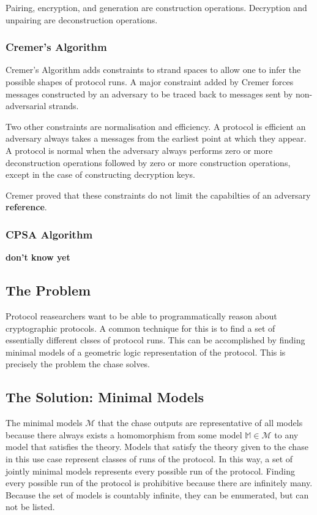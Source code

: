 			Pairing, encryption, and generation are construction operations.
			Decryption and unpairing are deconstruction operations.

		\subsubsection{Cremer's Algorithm}

			Cremer's Algorithm adds constraints to strand spaces to allow one
			to infer the possible shapes of protocol runs. A major constraint
			added by Cremer forces messages constructed by an adversary to be
			traced back to messages sent by non-adversarial strands.

			Two other constraints are normalisation and efficiency. A protocol
			is efficient an adversary always takes a messages from the earliest
			point at which they appear. A protocol is normal when the adversary
			always performs zero or more deconstruction operations followed by
			zero or more construction operations, except in the case of
			constructing decryption keys.

			Cremer proved that these constraints do not limit the capabilties
			of an adversary \textbf{reference}.

		\subsubsection{CPSA Algorithm}

			\textbf{ don't know yet }

	\subsection{The Problem}

		Protocol reasearchers want to be able to programmatically reason about
		cryptographic protocols. A common technique for this is to find a set of
		essentially different clsses of protocol runs. This can be accomplished by
		finding minimal models of a geometric logic representation of the protocol.
		This is precisely the problem the chase solves.

	\subsection{The Solution: Minimal Models}

		The minimal models $\mathcal{M}$ that the chase outputs are
		representative of all models because there always exists a homomorphism
		from some model $\mathbb{M} \in \mathcal{M}$ to any model that
		satisfies the theory. Models that satisfy the theory given to the chase
		in this use case represent classes of runs of the protocol. In this
		way, a set of jointly minimal models represents every possible run of
		the protocol. Finding every possible run of the protocol is prohibitive
		because there are infinitely many. Because the set of models is
		countably infinite, they can be enumerated, but can not be listed.

